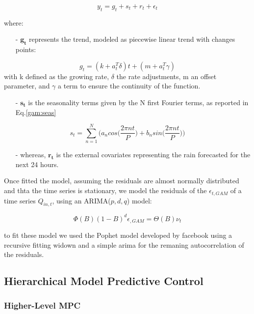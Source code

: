 \begin{equation}
	y_t = g_t + s_t + r_t + \epsilon_t
\end{equation}

where: 
\begin{itemize}
	\item[-] $\boldsymbol{g_t}$ represents the trend, modeled as piecewise linear trend with changes points:  
\end{itemize}
\begin{equation}
	g_t = (k+a_t^T \delta)t + (m + a_t^T\gamma)
\end{equation}
with k defined as the growing rate, $\delta$ the rate adjustments, m an offset parameter, and $\gamma$
a term to ensure the continuity of the function. 
\begin{itemize}
	\item[-] $\boldsymbol{s_t}$ is the seasonality terms given by the N first Fourier terms, as reported in Eq.\ref{gam:seas} 
\end{itemize}

\begin{equation}
	\label{gam:seas}
	s_t = \sum_{n=1}^{N} \Bigg (a_n cos \Bigg(\frac{2\pi nt}{P}\Bigg) + b_n sin \Bigg(\frac{2\pi nt}{P}\Bigg)\Bigg)
\end{equation}

\begin{itemize}
	\item[-] whereas, $\boldsymbol{r_t}$ is the external covariates representing the rain forecasted for the next 24 hours. 
\end{itemize}

Once fitted the model, assuming the residuals are almost normally distributed and thta the time 
series is stationary, we model the residuals of the \( \epsilon_{t, GAM} \) of a time series \( Q_{in,t} \), using an ARIMA(\(p, d, q\)) model:

\begin{equation}
	\Phi(B)(1 - B)^d \epsilon_{, GAM} = \Theta(B) \nu_t
\end{equation}

to fit these model we used the Pophet model developed by facebook using a recursive fitting widown 
and a simple arima for the remaning autocorrelation of the residuals. 

\subsection{Hierarchical Model Predictive Control}
	\subsubsection{Higher-Level MPC}


